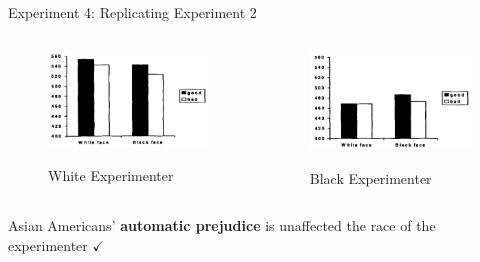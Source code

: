     \begin{frame}{Experiment 4: Replicating Experiment 2}
        
        \begin{columns}
            \begin{column}{0.45\textwidth}
                \begin{figure}
                \centering
                \includegraphics[height = 0.43 \textheight]{images/result4_2_white.png}
                
                {\footnotesize White Experimenter}
                \end{figure}
            \end{column}
            
            \begin{column}{0.45\textwidth}
                \begin{figure}
                    \centering
                    \includegraphics[height = 0.43 \textheight]{images/result4_2_black.png}
                    
                    {\footnotesize Black Experimenter}
                \end{figure}
            \end{column}
        \end{columns}
        \vspace*{10pt}
        Asian Americans' \textcolor{lightlavender!55!white}{\textbf{automatic prejudice}} is unaffected the race of the experimenter \textcolor{lightlavender!55!white}{$\checkmark$}
    \end{frame}